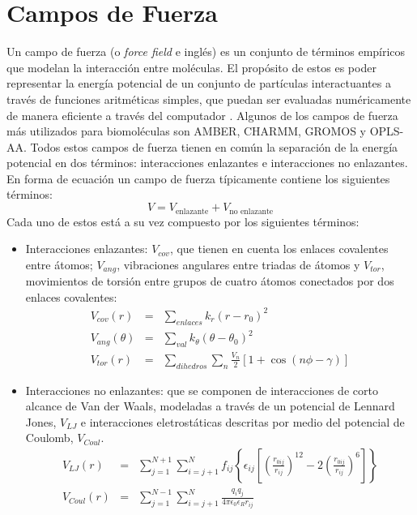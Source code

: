 \section{Campos de Fuerza}\label{sec:ff}
Un campo de fuerza (o \textit{force field} e ingl\'{e}s) es un conjunto de t\'{e}rminos emp\'{i}ricos que modelan la interacci\'{o}n entre mol\'{e}culas. El prop\'{o}sito de estos es poder representar la energ\'{i}a potencial de un conjunto de part\'{i}culas interactuantes a trav\'{e}s de funciones aritm\'{e}ticas simples, que puedan ser evaluadas num\'{e}ricamente de manera eficiente a trav\'{e}s del computador \cite{Kukol2014MolecularEdition}. Algunos de los campos de fuerza m\'{a}s utilizados para biomol\'{e}culas son AMBER, CHARMM, GROMOS y OPLS-AA. Todos estos campos de fuerza tienen en com\'{u}n la separaci\'{o}n de la energ\'{i}a potencial en dos t\'{e}rminos: interacciones enlazantes e interacciones no enlazantes. En forma de ecuaci\'{o}n un campo de fuerza t\'{i}picamente contiene los siguientes t\'{e}rminos:
\begin{equation}\label{eq:2}
    V=V_{\text{enlazante}}+V_{\text{no enlazante}}
\end{equation}
Cada uno de estos est\'{a} a su vez compuesto por los siguientes t\'{e}rminos:
\begin{itemize}
\item Interacciones enlazantes: $V_{cov}$, que tienen en cuenta los enlaces covalentes entre \'{a}tomos; $V_{ang}$, vibraciones angulares entre triadas de \'{a}tomos y $V_{tor}$, movimientos de torsi\'{o}n entre grupos de cuatro \'{a}tomos conectados por dos enlaces covalentes:
\begin{eqnarray}\label{eq:3}
V_{cov}(r)&=&\sum_{enlaces}k_r\left(r-r_0\right)^2\\
V_{ang}(\theta)&=&\sum_{val}k_\theta\left(\theta-\theta_{0}\right)^2\\
V_{tor}(r)&=&\sum_{dihedros}\sum_{n}\frac{V_n}{2}\left[1+\cos(n\phi-\gamma)\right]
\end{eqnarray}
\item Interacciones no enlazantes: que se componen de interacciones de corto alcance de Van der Waals, modeladas a trav\'{e}s de un potencial de Lennard Jones, $V_{LJ}$ e interacciones eletrost\'{a}ticas descritas por medio del potencial de Coulomb, $V_{Coul}$.
\begin{eqnarray}\label{eq:4}
V_{LJ}(r)&=&\sum_{j=1}^{N+1}\sum_{i=j+1}^N f_{ij}\left\{\epsilon_{ij}\left[\left(\frac{r_{0ij}}{r_{ij}}\right)^{12}-2\left(\frac{r_{0ij}}{r_{ij}}\right)^6\right]\right\}\\
V_{Coul}(r)&=&\sum_{j=1}^{N-1}\sum_{i=j+1}^{N}\frac{q_iq_j}{4\pi\epsilon_0\epsilon_R r_{ij}}
\end{eqnarray}
\end{itemize}
